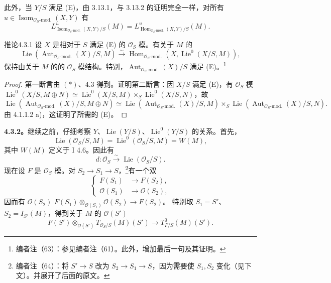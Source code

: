 此外，当 $Y/S$ 满足 (E)，由 3.13.1，与 3.13.2 的证明完全一样，对所有 $u\in\operatorname{Isom}_{\mathcal O_S\text{-mod.}}(X,Y)$ 有
\[L^u_{\operatorname{Isom}_{\mathcal O_S\text{-mod.}}(X,Y)/S}(M)=L^u_{\operatorname{Hom}_{\mathcal O_S\text{-mod.}}(X,Y)/S}(M).\tag{*}\]
\begin{SGAresult}{推论}{4.3.1}
设 $X$ 是相对于 $S$ 满足 (E) 的 $\mathcal O_S$ 模。有关于 $M$ 的
\[\operatorname{Lie}(\operatorname{Aut}_{\mathcal O_S\text{-mod.}}(X)/S,M)\xrightarrow{\sim}\operatorname{Hom}_{\mathcal O_S\text{-mod.}}(X,\operatorname{Lie}^0(X/S,M)),\]
保持由关于 $M$ 的的 $\mathcal O_S$ 模结构。特别，$\operatorname{Aut}_{\mathcal O_S\text{-mod.}}(X)/S$ 满足 (E)。\footnote{编者注（63）：参见编者注（61）。此外，增加最后一句及其证明。}
\end{SGAresult}
\begin{proof}
第一断言由 $(*)$、4.3 得到。证明第二断言：因 $X/S$ 满足 (E)，有 $\mathcal O_S$ 模
$\operatorname{Lie}^0(X/S,M\oplus N)\simeq\operatorname{Lie}^0(X/S,M)\times_S\operatorname{Lie}^0(X/S,N)$，故
\[\operatorname{Lie}(\operatorname{Aut}_{\mathcal O_S\text{-mod.}}(X)/S,M\oplus N)\simeq\operatorname{Lie}(\operatorname{Aut}_{\mathcal O_S\text{-mod.}}(X)/S,M)\times_S\operatorname{Lie}(\operatorname{Aut}_{\mathcal O_S\text{-mod.}}(X)/S,N).\]
由 4.1.1.2 a)，这证明了所需的 (E)。
\end{proof}
\textbf{4.3.2。}继续之前，仔细考察 $Y$、$\operatorname{Lie}(Y/S)$、$\operatorname{Lie}^0(Y/S)$ 的关系。首先，
\[\operatorname{Lie}(\mathcal O_S/S,M)=\operatorname{Lie}^0(\mathcal O_S/S,M)=W(M),\tag{1}\]
其中 $W(M)$ 定义于 I 4.6。因此有
\[d:\mathcal O_S\xrightarrow{\sim}\operatorname{Lie}(\mathcal O_S/S).\tag{2}\]
现在设 $F$ 是 $\mathcal O_S$ 模。对 $S_2\to S_1\to S$，\footnote{编者注（64）：将 $S'\to S$ 改为 $S_2\to S_1\to S$，因为需要使 $S_1,S_2$ 变化（见下文）。并展开了后面的原文。}有一个双
\[\left\{\begin{aligned}F(S_1)&\to F(S_2),\\\mathcal O(S_1)&\to\mathcal O(S_2),\end{aligned}\right.\tag{3}\]
因而有 $\mathcal O(S_2)$  $F(S_1)\otimes_{\mathcal O(S_1)}\mathcal O(S_2)\to F(S_2)$。
特别取 $S_1=S'$、$S_2=I_{S'}(M)$，得到关于 $M$ 的 $\mathcal O(S')$ 
\[F(S')\otimes_{\mathcal O(S')}T_{\mathcal O_S/S}(M)(S')\to T^0_{F/S}(M)(S').\]
